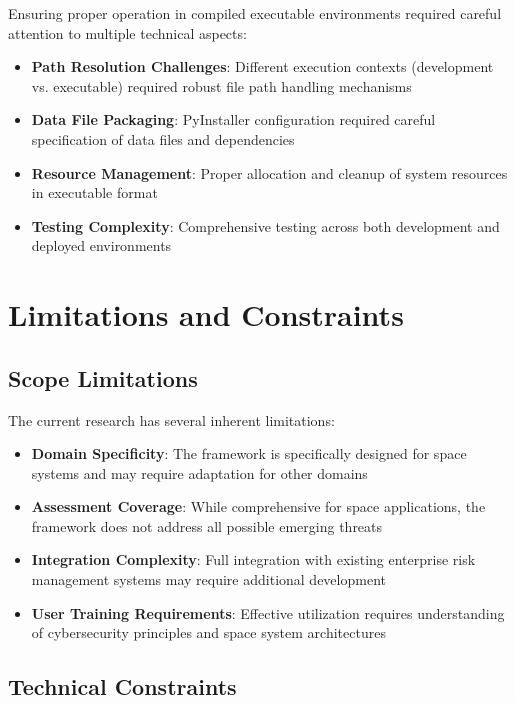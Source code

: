 \documentclass[binding=0.6cm]{sapthesis}
\begin{document}
Ensuring proper operation in compiled executable environments required careful attention to multiple technical aspects:

\begin{itemize}
    \item \textbf{Path Resolution Challenges}: Different execution contexts (development vs. executable) required robust file path handling mechanisms
    \item \textbf{Data File Packaging}: PyInstaller configuration required careful specification of data files and dependencies
    \item \textbf{Resource Management}: Proper allocation and cleanup of system resources in executable format
    \item \textbf{Testing Complexity}: Comprehensive testing across both development and deployed environments
\end{itemize}

\section{Limitations and Constraints}

\subsection{Scope Limitations}

The current research has several inherent limitations:

\begin{itemize}
    \item \textbf{Domain Specificity}: The framework is specifically designed for space systems and may require adaptation for other domains
    \item \textbf{Assessment Coverage}: While comprehensive for space applications, the framework does not address all possible emerging threats
    \item \textbf{Integration Complexity}: Full integration with existing enterprise risk management systems may require additional development
    \item \textbf{User Training Requirements}: Effective utilization requires understanding of cybersecurity principles and space system architectures
\end{itemize}

\subsection{Technical Constraints}
\end{document}
